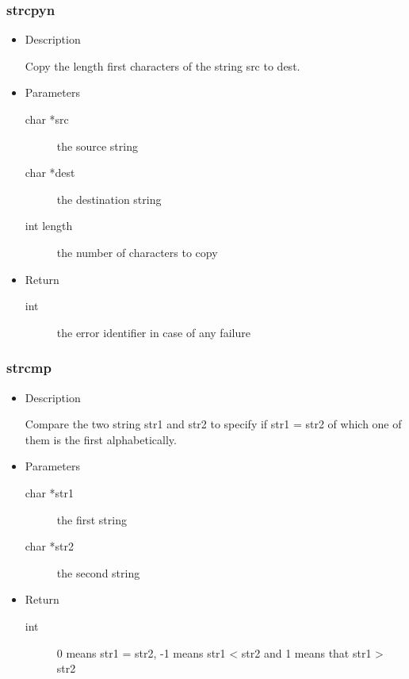 \subsubsection{strcpyn}
\begin{itemize}
  \item{Description}

	 Copy the length first characters of the string src to dest.
  \item{Parameters}
	 \begin{description}
		\item[char *src] the source string
		\item[char *dest] the destination string
		\item[int length] the number of characters to copy
	 \end{description}
  \item{Return}
	 \begin{description}
		\item[int] the error identifier in case of any failure
	 \end{description}
\end{itemize}

\subsubsection{strcmp}
\begin{itemize}
  \item{Description}

	 Compare the two string str1 and str2 to specify if str1 = str2
	 of which one of them is the first alphabetically.
  \item{Parameters}
	 \begin{description}
		\item[char *str1] the first string
		\item[char *str2] the second string
	 \end{description}
  \item{Return}
	 \begin{description}
		\item[int] 0 means str1 = str2, -1 means str1 < str2 and 1 means
		  that str1 > str2
	 \end{description}
\end{itemize}

